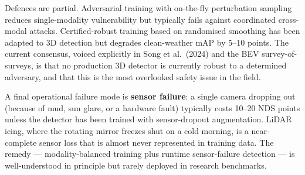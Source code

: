 \documentclass{article}
\begin{document}
Defences are partial. Adversarial training with on-the-fly perturbation sampling reduces single-modality vulnerability but typically fails against coordinated cross-modal attacks. Certified-robust training based on randomised smoothing has been adapted to 3D detection but degrades clean-weather mAP by 5--10 points. The current consensus, voiced explicitly in Song et al.~(2024) and the BEV survey-of-surveys, is that no production 3D detector is currently robust to a determined adversary, and that this is the most overlooked safety issue in the field.

A final operational failure mode is \textbf{sensor failure}: a single camera dropping out (because of mud, sun glare, or a hardware fault) typically costs 10--20 NDS points unless the detector has been trained with sensor-dropout augmentation. LiDAR icing, where the rotating mirror freezes shut on a cold morning, is a near-complete sensor loss that is almost never represented in training data. The remedy --- modality-balanced training plus runtime sensor-failure detection --- is well-understood in principle but rarely deployed in research benchmarks.
\end{document}
